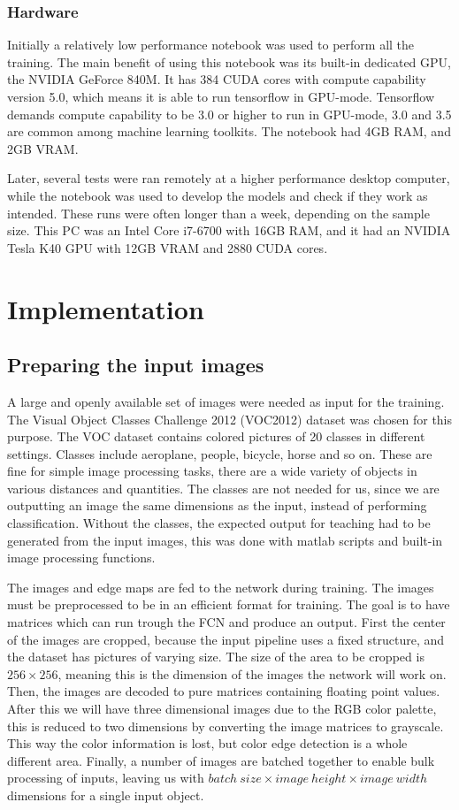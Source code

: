 \documentclass[12pt]{report}
\begin{document}
\subsection{Hardware}
Initially a relatively low performance notebook was used to perform all the training. The main benefit of using this notebook was its built-in dedicated GPU, the NVIDIA GeForce 840M. It has 384 CUDA cores with compute capability version 5.0, which means it is able to run tensorflow in GPU-mode. Tensorflow demands compute capability to be 3.0 or higher to run in GPU-mode, 3.0 and 3.5 are common among machine learning toolkits. The notebook had 4GB RAM, and 2GB VRAM.\par

Later, several tests were ran remotely at a higher performance desktop computer, while the notebook was used to develop the models and check if they work as intended. These runs were often longer than a week, depending on the sample size. This PC was an Intel Core i7-6700 with 16GB RAM, and it had an NVIDIA Tesla K40 GPU with 12GB VRAM and 2880 CUDA cores.
\chapter{Implementation}
\section{Preparing the input images}
A large and openly available set of images were needed as input for the training. The Visual Object Classes Challenge 2012 (VOC2012) dataset \cite{pascal-voc-2012} was chosen for this purpose. The VOC dataset contains colored pictures of 20 classes in different settings. Classes include aeroplane, people, bicycle, horse and so on. These are fine for simple image processing tasks, there are a wide variety of objects in various distances and quantities. The classes are not needed for us, since we are outputting an image the same dimensions as the input, instead of performing classification. Without the classes, the expected output for teaching had to be generated from the input images, this was done with matlab scripts and built-in image processing functions.\par

The images and edge maps are fed to the network during training. The images must be preprocessed to be in an efficient format for training. The goal is to have matrices which can run trough the FCN and produce an output. First the center of the images are cropped, because the input pipeline uses a fixed structure, and the dataset has pictures of varying size. The size of the area to be cropped is $256×256$, meaning this is the dimension of the images the network will work on. Then, the images are decoded to pure matrices containing floating point values. After this we will have three dimensional images due to the RGB color palette, this is reduced to two dimensions by converting the image matrices to grayscale. This way the color information is lost, but color edge detection is a whole different area. Finally, a number of images are batched together to enable bulk processing of inputs, leaving us with $ batch\ size × image\ height × image\ width $ dimensions for a single input object.
\end{document}

